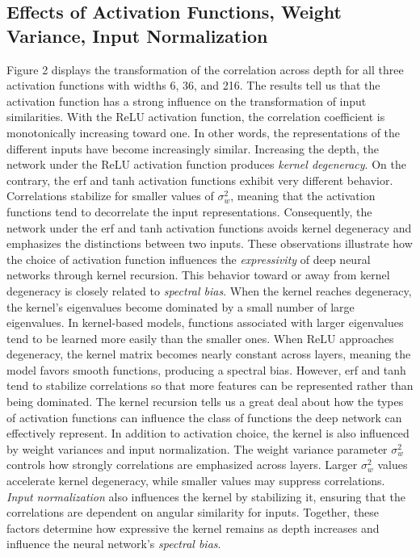 \documentclass{article}
\newcommand{\NL}{\newline 
\newline}
\begin{document}
\subsection{Effects of Activation Functions, Weight Variance, Input Normalization}
Figure 2 displays the transformation of the correlation across depth for all three activation functions with widths 6, 36, and 216. The results tell us that the activation function has a strong influence on the transformation of input similarities.
\NL
With the ReLU activation function, the correlation coefficient is monotonically increasing toward one. In other words, the representations of the different inputs have become increasingly similar. Increasing the depth, the network under the ReLU activation function produces \textit{kernel degeneracy}. On the contrary, the erf and tanh activation functions exhibit very different behavior. Correlations stabilize for smaller values of $\sigma_w^2$, meaning that the activation functions tend to decorrelate the input representations. Consequently, the network under the erf and tanh activation functions avoids kernel degeneracy and emphasizes the distinctions between two inputs. These observations illustrate how the choice of activation function influences the \textit{expressivity} of deep neural networks through kernel recursion.
\NL
This behavior toward or away from kernel degeneracy is closely related to \textit{spectral bias}. When the kernel reaches degeneracy, the kernel's eigenvalues become dominated by a small number of large eigenvalues. In kernel-based models, functions associated with larger eigenvalues tend to be learned more easily than the smaller ones. When ReLU approaches degeneracy, the kernel matrix becomes nearly constant across layers, meaning the model favors smooth functions, producing a spectral bias. However, erf and tanh tend to stabilize correlations so that more features can be represented rather than being dominated. The kernel recursion tells us a great deal about how the types of activation functions can influence the class of functions the deep network can effectively represent. 
\NL
In addition to activation choice, the kernel is also influenced by weight variances and input normalization. The weight variance parameter $\sigma_w^2$ controls how strongly correlations are emphasized across layers. Larger $\sigma_w^2$ values accelerate kernel degeneracy, while smaller values may suppress correlations. \textit{Input normalization} also influences the kernel by stabilizing it, ensuring that the correlations are dependent on angular similarity for inputs. Together, these factors determine how expressive the kernel remains as depth increases and influence the neural network's \textit{spectral bias}.
\end{document}
